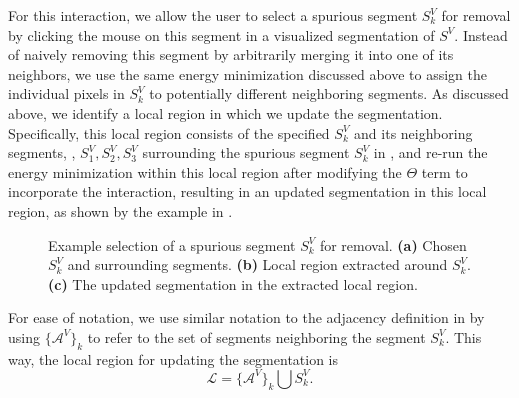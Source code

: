 \documentclass[]{spie}  %
\begin{document}
For this interaction, we allow the user to select a spurious segment
$S^V_k$ for removal by clicking the mouse on this segment in a
visualized segmentation of $S^V$.  Instead of naively removing this
segment by arbitrarily merging it into one of its neighbors, we use
the same energy minimization discussed above to assign the individual
pixels in $S^V_k$ to potentially different neighboring segments.  As
discussed above, we identify a local region in which we update the
segmentation.  Specifically, this local region consists of the
specified $S^V_k$ and its neighboring segments, \eg, $S^V_1, S^V_2,
S^V_3$ surrounding the spurious segment $S^V_k$ in
, and re-run the energy minimization within this
local region after modifying the $\Theta$ term to incorporate the
interaction, resulting in an updated segmentation in this local
region, as shown by the example in .
\begin{figure}[htbp]
\centering
{}
\hspace{0.1em}
\hspace{0.1em}
\caption{Example selection of a spurious segment $S^V_k$ for removal.
  \textbf{(a)} Chosen $S^V_k$ and surrounding segments.  \textbf{(b)}
  Local region extracted around $S^V_k$.  \textbf{(c)} The updated
  segmentation in the extracted local region.}
\label{fig:removal-ex}
\end{figure}
For ease of notation, we use similar notation to the adjacency
definition in  by using $\{\mathcal{A}^V\}_k$ to refer to the
set of segments neighboring the segment $S^V_k$.  This way, the local
region for updating the segmentation is
\begin{equation}
  \mathcal{L} = \{\mathcal{A}^V\}_k \bigcup S^V_k .
\end{equation}
\end{document}
